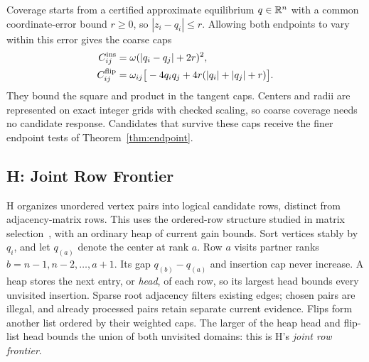 Coverage starts from a certified approximate equilibrium $q\in\mathbb R^n$ with a common coordinate-error bound $r\ge0$, so $|z_i-q_i|\le r$. Allowing both endpoints to vary within this error gives the coarse caps
\begin{equation}
 \begin{aligned}
 C^{\rm ins}_{ij}&=\omega(|q_i-q_j|+2r)^2,\\
 C^{\rm flip}_{ij}&=\omega_{ij}\big[-4q_iq_j+
                   4r(|q_i|+|q_j|+r)\big].
 \end{aligned}
 \label{eq:frontier-caps}
\end{equation}
They bound the square and product in the tangent caps. Centers and radii are represented on exact integer grids with checked scaling, so coarse coverage needs no candidate response. Candidates that survive these caps receive the finer endpoint tests of Theorem~\ref{thm:endpoint}.

\subsection{H: Joint Row Frontier}
H organizes unordered vertex pairs into logical candidate rows, distinct from adjacency-matrix rows. This uses the ordered-row structure studied in matrix selection~\cite{kaplan2019rowsorted}, with an ordinary heap of current gain bounds. Sort vertices stably by $q_i$, and let $q_{(a)}$ denote the center at rank $a$. Row $a$ visits partner ranks $b=n-1,n-2,\ldots,a+1$. Its gap $q_{(b)}-q_{(a)}$ and insertion cap never increase. A heap stores the next entry, or \emph{head}, of each row, so its largest head bounds every unvisited insertion. Sparse root adjacency filters existing edges; chosen pairs are illegal, and already processed pairs retain separate current evidence. Flips form another list ordered by their weighted caps. The larger of the heap head and flip-list head bounds the union of both unvisited domains: this is H's \emph{joint row frontier}.

